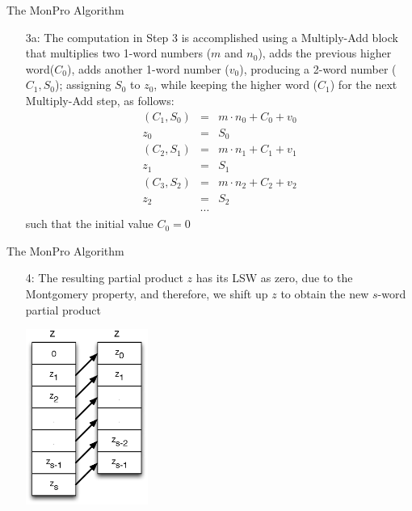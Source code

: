 \documentclass[xcolor=dvipsnames]{beamer}
\begin{document}
\begin{frame}{The MonPro Algorithm}
\begin{enumerate}

\item[3a:] The computation in Step 3 is accomplished using a Multiply-Add block
that multiplies two 1-word numbers ($m$ and $n_0$), adds the previous higher word($C_0$), adds another 1-word number ($v_0$), producing 
a 2-word number ($C_1,S_0$); assigning $S_0$ to $z_0$, while keeping the higher word ($C_1$)
for the next Multiply-Add step, as follows:
\begin{eqnarray*}
(C_1,S_0) & = & m \cdot n_0 + C_0 + v_0\\
z_0 & = & S_0 \\[0.5em]
(C_2,S_1) & = & m \cdot n_1 + C_1 + v_1 \\
z_1 & = & S_1 \\[0.5em]
(C_3,S_2) & = & m \cdot n_2 + C_2 + v_2 \\
z_2 & = & S_2 \\
& \cdots &
\end{eqnarray*}
such that the initial value $C_0=0$

\end{enumerate}
\end{frame}

\begin{frame}{The MonPro Algorithm}
\begin{enumerate}

\item[4:] The resulting partial product $z$ has its LSW as zero, due to
the Montgomery property, and therefore, we shift up $z$ to obtain
the new $s$-word partial product

\centerline{\includegraphics[width=4cm]{mp4.eps}}

\end{enumerate}
\end{frame}
\end{document}
